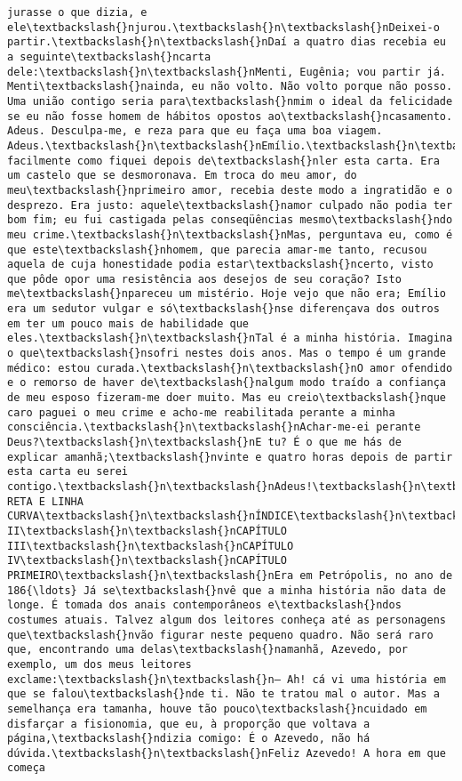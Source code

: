 \documentclass[11pt]{article}
\begin{document}
\begin{Verbatim}[commandchars=\\\{\}]
jurasse o que dizia, e ele\textbackslash{}njurou.\textbackslash{}n\textbackslash{}nDeixei-o partir.\textbackslash{}n\textbackslash{}nDaí a quatro dias recebia eu a seguinte\textbackslash{}ncarta dele:\textbackslash{}n\textbackslash{}nMenti, Eugênia; vou partir já. Menti\textbackslash{}nainda, eu não volto. Não volto porque não posso. Uma união contigo seria para\textbackslash{}nmim o ideal da felicidade se eu não fosse homem de hábitos opostos ao\textbackslash{}ncasamento. Adeus. Desculpa-me, e reza para que eu faça uma boa viagem. Adeus.\textbackslash{}n\textbackslash{}nEmílio.\textbackslash{}n\textbackslash{}nAvalias facilmente como fiquei depois de\textbackslash{}nler esta carta. Era um castelo que se desmoronava. Em troca do meu amor, do meu\textbackslash{}nprimeiro amor, recebia deste modo a ingratidão e o desprezo. Era justo: aquele\textbackslash{}namor culpado não podia ter bom fim; eu fui castigada pelas conseqüências mesmo\textbackslash{}ndo meu crime.\textbackslash{}n\textbackslash{}nMas, perguntava eu, como é que este\textbackslash{}nhomem, que parecia amar-me tanto, recusou aquela de cuja honestidade podia estar\textbackslash{}ncerto, visto que pôde opor uma resistência aos desejos de seu coração? Isto me\textbackslash{}npareceu um mistério. Hoje vejo que não era; Emílio era um sedutor vulgar e só\textbackslash{}nse diferençava dos outros em ter um pouco mais de habilidade que eles.\textbackslash{}n\textbackslash{}nTal é a minha história. Imagina o que\textbackslash{}nsofri nestes dois anos. Mas o tempo é um grande médico: estou curada.\textbackslash{}n\textbackslash{}nO amor ofendido e o remorso de haver de\textbackslash{}nalgum modo traído a confiança de meu esposo fizeram-me doer muito. Mas eu creio\textbackslash{}nque caro paguei o meu crime e acho-me reabilitada perante a minha consciência.\textbackslash{}n\textbackslash{}nAchar-me-ei perante Deus?\textbackslash{}n\textbackslash{}nE tu? É o que me hás de explicar amanhã;\textbackslash{}nvinte e quatro horas depois de partir esta carta eu serei contigo.\textbackslash{}n\textbackslash{}nAdeus!\textbackslash{}n\textbackslash{}nLINHA RETA E LINHA CURVA\textbackslash{}n\textbackslash{}nÍNDICE\textbackslash{}n\textbackslash{}nCAPÍTULO\textbackslash{}nPRIMEIRO\textbackslash{}n\textbackslash{}nCAPÍTULO II\textbackslash{}n\textbackslash{}nCAPÍTULO III\textbackslash{}n\textbackslash{}nCAPÍTULO IV\textbackslash{}n\textbackslash{}nCAPÍTULO PRIMEIRO\textbackslash{}n\textbackslash{}nEra em Petrópolis, no ano de 186{\ldots} Já se\textbackslash{}nvê que a minha história não data de longe. É tomada dos anais contemporâneos e\textbackslash{}ndos costumes atuais. Talvez algum dos leitores conheça até as personagens que\textbackslash{}nvão figurar neste pequeno quadro. Não será raro que, encontrando uma delas\textbackslash{}namanhã, Azevedo, por exemplo, um dos meus leitores exclame:\textbackslash{}n\textbackslash{}n— Ah! cá vi uma história em que se falou\textbackslash{}nde ti. Não te tratou mal o autor. Mas a semelhança era tamanha, houve tão pouco\textbackslash{}ncuidado em disfarçar a fisionomia, que eu, à proporção que voltava a página,\textbackslash{}ndizia comigo: É o Azevedo, não há dúvida.\textbackslash{}n\textbackslash{}nFeliz Azevedo! A hora em que começa 
\end{Verbatim}
\end{document}
